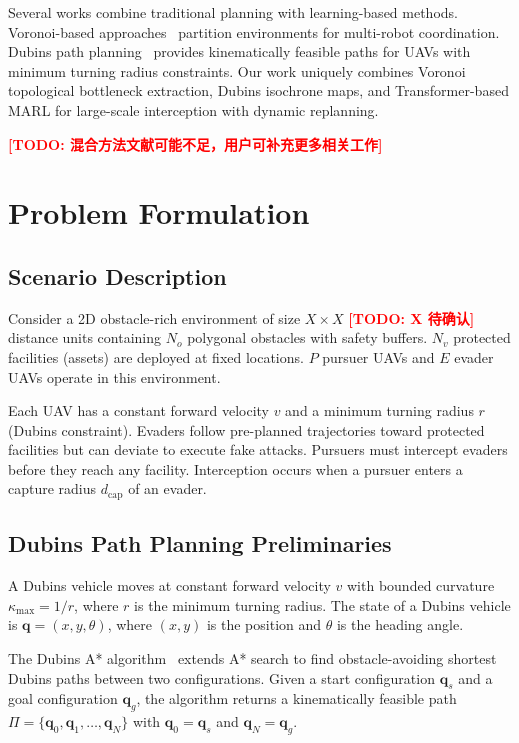 \documentclass[10pt,conference]{IEEEtran}
\newcommand{\marktodo}[1]{\textcolor{red}{\textbf{[TODO: #1]}}}
\begin{document}
Several works combine traditional planning with learning-based methods. Voronoi-based approaches~\cite{voronoi_multirobot,voronoi_pursuit} partition environments for multi-robot coordination. Dubins path planning~\cite{dubins_astar,dubins_intercept} provides kinematically feasible paths for UAVs with minimum turning radius constraints. Our work uniquely combines Voronoi topological bottleneck extraction, Dubins isochrone maps, and Transformer-based MARL for large-scale interception with dynamic replanning.

\marktodo{混合方法文献可能不足，用户可补充更多相关工作}

\section{Problem Formulation}

\subsection{Scenario Description}

Consider a 2D obstacle-rich environment of size $X \times X$ \marktodo{X 待确认} distance units containing $N_o$ polygonal obstacles with safety buffers. $N_v$ protected facilities (assets) are deployed at fixed locations. $P$ pursuer UAVs and $E$ evader UAVs operate in this environment.

Each UAV has a constant forward velocity $v$ and a minimum turning radius $r$ (Dubins constraint). Evaders follow pre-planned trajectories toward protected facilities but can deviate to execute fake attacks. Pursuers must intercept evaders before they reach any facility. Interception occurs when a pursuer enters a capture radius $d_{\text{cap}}$ of an evader.

\subsection{Dubins Path Planning Preliminaries}

A Dubins vehicle moves at constant forward velocity $v$ with bounded curvature $\kappa_{\max} = 1/r$, where $r$ is the minimum turning radius. The state of a Dubins vehicle is $\mathbf{q} = (x, y, \theta)$, where $(x, y)$ is the position and $\theta$ is the heading angle.

The Dubins A* algorithm~\cite{dubins_astar} extends A* search to find obstacle-avoiding shortest Dubins paths between two configurations. Given a start configuration $\mathbf{q}_s$ and a goal configuration $\mathbf{q}_g$, the algorithm returns a kinematically feasible path $\Pi = \{\mathbf{q}_0, \mathbf{q}_1, \ldots, \mathbf{q}_N\}$ with $\mathbf{q}_0 = \mathbf{q}_s$ and $\mathbf{q}_N = \mathbf{q}_g$.
\end{document}
